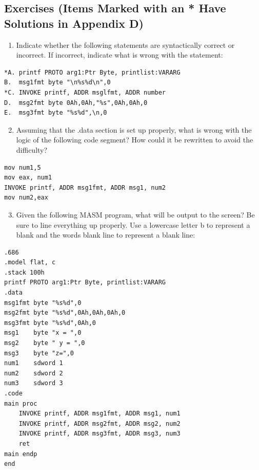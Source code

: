 \documentclass[10pt]{book}
\begin{document}
\subsection{Exercises (Items Marked with an * Have Solutions in Appendix D)}
\begin{enumerate}
  \item Indicate whether the following statements are syntactically correct or incorrect. If incorrect, indicate what is wrong with the statement:
\end{enumerate}

\begin{verbatim}
*A. printf PROTO arg1:Ptr Byte, printlist:VARARG
B.  msg1fmt byte "\n%s%d\n",0
*C. INVOKE printf, ADDR msglfmt, ADDR number
D.  msg2fmt byte 0Ah,0Ah,"%s",0Ah,0Ah,0
E.  msg3fmt byte "%s%d",\n,0
\end{verbatim}

\begin{enumerate}
  \setcounter{enumi}{1}
  \item Assuming that the .data section is set up properly, what is wrong with the logic of the following code segment? How could it be rewritten to avoid the difficulty?
\end{enumerate}

\begin{verbatim}
mov num1,5
mov eax, num1
INVOKE printf, ADDR msg1fmt, ADDR msg1, num2
mov num2,eax
\end{verbatim}

\begin{enumerate}
  \setcounter{enumi}{2}
  \item Given the following MASM program, what will be output to the screen? Be sure to line everything up properly. Use a lowercase letter b to represent a blank and the words blank line to represent a blank line:
\end{enumerate}

\begin{verbatim}
.686
.model flat, c
.stack 100h
printf PROTO arg1:Ptr Byte, printlist:VARARG
.data
msg1fmt byte "%s%d",0
msg2fmt byte "%s%d",0Ah,0Ah,0Ah,0
msg3fmt byte "%s%d",0Ah,0
msg1    byte "x = ",0
msg2    byte " y = ",0
msg3    byte "z=",0
num1    sdword 1
num2    sdword 2
num3    sdword 3
.code
main proc
    INVOKE printf, ADDR msg1fmt, ADDR msg1, num1
    INVOKE printf, ADDR msg2fmt, ADDR msg2, num2
    INVOKE printf, ADDR msg3fmt, ADDR msg3, num3
    ret
main endp
end
\end{verbatim}
\end{document}

